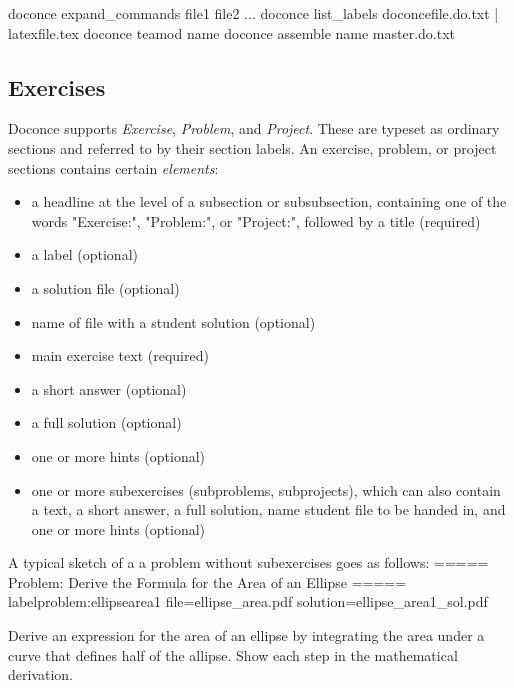 \documentclass[twoside]{book}
\begin{document}
{doconce expand_commands file1 file2 ...
doconce list_labels doconcefile.do.txt | latexfile.tex
doconce teamod name
doconce assemble name master.do.txt
\eshpro

\subsection{Exercises}

Doconce supports \emph{Exercise}, \emph{Problem}, and \emph{Project}. These are typeset
as ordinary sections and referred to by their section labels.
An exercise, problem, or project sections contains certain \emph{elements}:

\begin{itemize}
  \item a headline at the level of a subsection or subsubsection,
    containing one of the words "Exercise:", "Problem:", or
    "Project:", followed by a title (required)

  \item a label (optional)

  \item a solution file (optional)

  \item name of file with a student solution (optional)

  \item main exercise text (required)

  \item a short answer (optional)

  \item a full solution (optional)

  \item one or more hints (optional)

  \item one or more subexercises (subproblems, subprojects), which can also
    contain a text, a short answer, a full solution, name student file
    to be handed in, and one or more hints (optional)
\end{itemize}

\noindent
A typical sketch of a a problem without subexercises goes as follows:
\bccq
===== Problem: Derive the Formula for the Area of an Ellipse =====
label{problem:ellipsearea1}
file=ellipse_area.pdf
solution=ellipse_area1_sol.pdf

Derive an expression for the area of an ellipse by integrating
the area under a curve that defines half of the allipse.
Show each step in the mathematical derivation.

}
\end{document}
